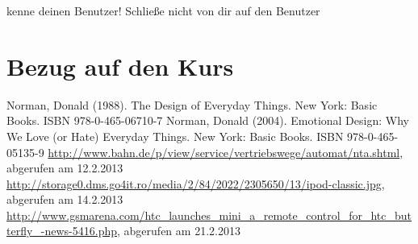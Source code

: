 \documentclass[parskip,headsepline, headtopline, %
footsepline, oneside, 12pt, headings=small]{scrreprt}
\begin{document}
\textrightarrow kenne deinen Benutzer! Schließe nicht von dir auf den Benutzer

\section{Bezug auf den Kurs}






\begin{thebibliography}{9}
	 Norman, Donald (1988). The Design of Everyday Things. New York: Basic Books. ISBN 978-0-465-06710-7 
	 Norman, Donald (2004). Emotional Design: Why We Love (or Hate) Everyday Things. New York: Basic Books. ISBN 978-0-465-05135-9
	 \url{http://www.bahn.de/p/view/service/vertriebswege/automat/nta.shtml}, abgerufen am 12.2.2013
	 \url{http://storage0.dms.go4it.ro/media/2/84/2022/2305650/13/ipod-classic.jpg}, abgerufen am 14.2.2013
	  \url{http://www.gsmarena.com/htc_launches_mini_a_remote_control_for_htc_butterfly_-news-5416.php}, abgerufen am 21.2.2013
\end{thebibliography}
\end{document}
